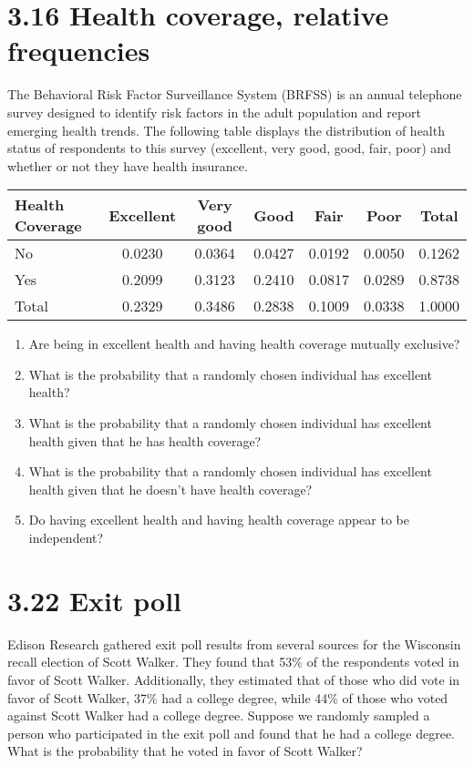 \documentclass{article}
\begin{document}
\section*{3.16 Health coverage, relative frequencies}
The Behavioral Risk Factor Surveillance System (BRFSS) is an annual telephone survey designed to identify risk factors in the adult population and report emerging health trends. The following table displays the distribution of health status of respondents to this survey (excellent, very good, good, fair, poor) and whether or not they have health insurance. 

\begin{table}[H]
\centering
\settowidth{}
\setlength\extrarowheight{2pt}
\begin{tabulary}{1.0\linewidth}{|L|C|C|C|C|C|C|}

\hline
\textbf{Health Coverage} & \textbf{Excellent} & \textbf{Very good} & \textbf{Good} & \textbf{Fair} & \textbf{Poor} & \textbf{Total} \\
\hline
No & 0.0230 & 0.0364 & 0.0427 & 0.0192 & 0.0050 & 0.1262 \\
Yes & 0.2099 & 0.3123 & 0.2410 & 0.0817 & 0.0289 & 0.8738 \\
\hline
Total & 0.2329 & 0.3486 & 0.2838 & 0.1009 & 0.0338 & 1.0000 \\
\hline
\end{tabulary}
\end{table}

\begin{enumerate}
    \item[(a)] Are being in excellent health and having health coverage mutually exclusive?
    \item[(b)] What is the probability that a randomly chosen individual has excellent health?
    \item[(c)] What is the probability that a randomly chosen individual has excellent health given that he has health coverage?
    \item[(d)] What is the probability that a randomly chosen individual has excellent health given that he doesn’t have health coverage?
    \item[(e)] Do having excellent health and having health coverage appear to be independent?
\end{enumerate}

\section*{3.22 Exit poll}
Edison Research gathered exit poll results from several sources for the Wisconsin recall election of Scott Walker. They found that 53\% of the respondents voted in favor of Scott Walker. Additionally, they estimated that of those who did vote in favor of Scott Walker, 37\% had a college degree, while 44\% of those who voted against Scott Walker had a college degree. Suppose we randomly sampled a person who participated in the exit poll and found that he had a college degree. What is the probability that he voted in favor of Scott Walker?
\end{document}
